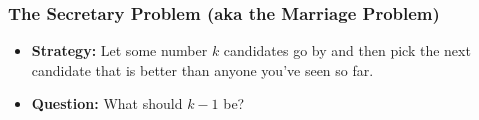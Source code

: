 \documentclass{beamer}
\begin{document}
\begin{frame}
\frametitle{The Secretary Problem (aka the Marriage Problem)}
\begin{itemize}
	\item \textbf{Strategy:} Let some number $k$ candidates go by and then pick the next candidate that is better than anyone you've seen so far.
	\item \textbf{Question:} What should $k - 1$ be?
\end{itemize}

\end{frame}
\end{document}
